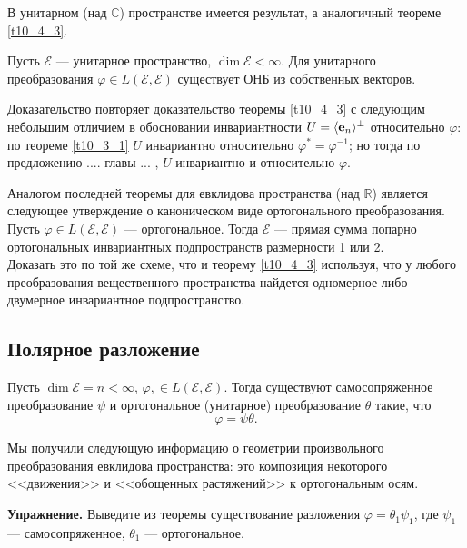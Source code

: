В унитарном (над $\mathbb{C}$) пространстве имеется результат, а аналогичный теореме \ref{t10_4_3}.

\begin{theor}\label{t10_5_3} 
Пусть $\mathcal{E}$ --- унитарное пространство, $\dim \mathcal{E}<\infty$. Для унитарного преобразования $\varphi\in L(\mathcal{E}, \mathcal{E})$
существует ОНБ из собственных векторов.
\end{theor}
\dok Доказательство повторяет доказательство теоремы \ref{t10_4_3} с следующим небольшим отличием
в обосновании инвариантности $U=\langle \mathbf{e}_n \rangle^{\bot}$ относительно $\varphi$:
по теореме \ref{t10_3_1} $U$ инвариантно относительно $\varphi^{*}=\varphi^{-1}$; но тогда по предложению .... главы ... ,
$U$ инвариантно и относительно $\varphi$.
\edok


{\footnotesize 
Аналогом последней теоремы для евклидова пространства (над $\mathbb{R}$) является следующее утверждение о каноническом виде ортогонального преобразования.
Пусть $\varphi\in L(\mathcal{E}, \mathcal{E})$ --- ортогональное. Тогда $\mathcal{E}$ --- 
прямая сумма попарно ортогональных инвариантных подпространств размерности 1 или 2.\\
Доказать это по той же схеме, что и теорему \ref{t10_4_3} используя, что у любого преобразования вещественного пространства
найдется одномерное либо двумерное инвариантное подпространство.
}


\subsection{Полярное разложение}


\begin{theor}\label{t10_6_105} 
Пусть $\dim \mathcal{E}=n<\infty $, $\varphi, \in L(\mathcal{E}, \mathcal{E})$.
Тогда существуют самосопряженное преобразование  $\psi$ и ортогональное (унитарное) преобразование $\theta$ такие, что
$$\varphi = \psi \theta.$$ 
\end{theor}
\dok 
\edok

Мы получили следующую информацию о геометрии произвольного преобразования евклидова пространства:
это композиция некоторого <<движения>> и <<обощенных растяжений>> к ортогональным осям.


{\bf Упражнение.}
Выведите из теоремы существование разложения
$\varphi = \theta_1 \psi _1$, где $\psi _1$ --- самосопряженное, $\theta _1$ --- ортогональное.


